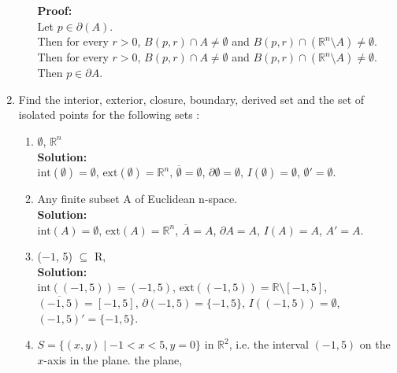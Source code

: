 \documentclass{article}
\begin{document}
\begin{enumerate}
\begin{enumerate}
\textbf{Proof:} \\
Let $p \in \partial(A)$. \\
Then for every $r > 0$, $B(p,r) \cap A \neq \emptyset$ and $B(p,r) \cap (\mathbb{R}^n \setminus A) \neq \emptyset$. \\
Then for every $r > 0$, $B(p,r) \cap A \neq \emptyset$ and $B(p,r) \cap (\mathbb{R}^n \setminus A) \neq \emptyset$. \\
Then $p \in \partial A$. \\

    

 

\end{enumerate}
\item Find the interior, exterior, closure, boundary, derived set and the set of isolated points for the following sets :
\begin{enumerate}
    \item $\emptyset$, $\mathbb{R}^n$\\
    
\textbf{Solution:} \\
$\text{int}(\emptyset) = \emptyset$, $\text{ext}(\emptyset) = \mathbb{R}^n$, $\overline{\emptyset} = \emptyset$, $\partial \emptyset = \emptyset$, $I(\emptyset) = \emptyset$, $\emptyset' = \emptyset$.\\
    
    
    \item  Any finite subset A of Euclidean n-space.\\
    
\textbf{Solution:} \\
$\text{int}(A) = \emptyset$, $\text{ext}(A) = \mathbb{R}^n$, $\overline{A} = A$, $\partial A = A$, $I(A) = A$, $A' = A$.\\

    
    \item  ($-1$, 5) $\subseteq$ R,\\
    
\textbf{Solution:} \\
$\text{int}((-1,5)) = (-1,5)$, $\text{ext}((-1,5)) = \mathbb{R} \setminus [-1,5]$, $\overline{(-1,5)} = [-1,5]$, $\partial (-1,5) = \{-1,5\}$, $I((-1,5)) = \emptyset$, $(-1,5)' = \{-1,5\}$.\\

    
    \item $S=\{(x,y) \mid -1<x<5, y=0\}$ in $\mathbb{R}^2$, i.e. the interval $(-1,5)$ on the $x$-axis in the plane.
    the plane,\\


\end{enumerate}
\end{enumerate}
\end{document}
